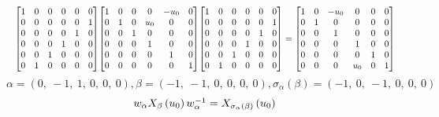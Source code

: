 \documentclass[11pt]{article}
\theoremstyle{definition}
\begin{document}
\[
\scaletoalign{\textwidth}{{\left[\begin{matrix}1 & 0 & 0 & 0 & 0 & 0\\0 & 0 & 0 & 0 & 0 & 1\\0 & 0 & 0 & 0 & 1 & 0\\0 & 0 & 0 & 1 & 0 & 0\\0 & 0 & 1 & 0 & 0 & 0\\0 & 1 & 0 & 0 & 0 & 0\end{matrix}\right]} {\left[\begin{matrix}1 & 0 & 0 & 0 & - u_{0} & 0\\0 & 1 & 0 & u_{0} & 0 & 0\\0 & 0 & 1 & 0 & 0 & 0\\0 & 0 & 0 & 1 & 0 & 0\\0 & 0 & 0 & 0 & 1 & 0\\0 & 0 & 0 & 0 & 0 & 1\end{matrix}\right]} {\left[\begin{matrix}1 & 0 & 0 & 0 & 0 & 0\\0 & 0 & 0 & 0 & 0 & 1\\0 & 0 & 0 & 0 & 1 & 0\\0 & 0 & 0 & 1 & 0 & 0\\0 & 0 & 1 & 0 & 0 & 0\\0 & 1 & 0 & 0 & 0 & 0\end{matrix}\right]} = {\left[\begin{matrix}1 & 0 & - u_{0} & 0 & 0 & 0\\0 & 1 & 0 & 0 & 0 & 0\\0 & 0 & 1 & 0 & 0 & 0\\0 & 0 & 0 & 1 & 0 & 0\\0 & 0 & 0 & 0 & 1 & 0\\0 & 0 & 0 & u_{0} & 0 & 1\end{matrix}\right]}}
\]
\[
\alpha = \left( 0, \  -1, \  1, \  0, \  0, \  0\right), \beta = \left( -1, \  -1, \  0, \  0, \  0, \  0\right), \sigma_{\alpha}(\beta) = \left( -1, \  0, \  -1, \  0, \  0, \  0\right)
\]
\[
\scaletoalign{\textwidth}{w_{\alpha} X_{\beta}\left(u_{0}\right) w_{\alpha}^{-1} = X_{\sigma_{\alpha}\left(\beta\right)}\left(u_{0}\right)}
\]
\end{document}
